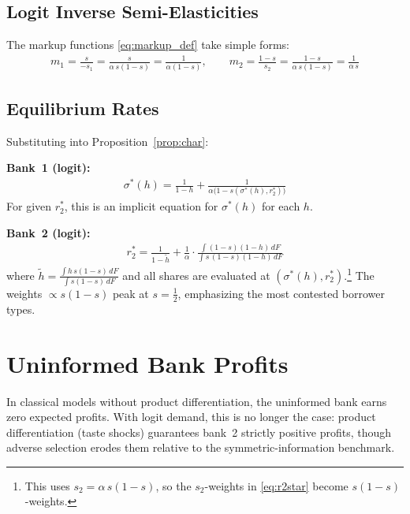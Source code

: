 \documentclass[12pt]{article}
\theoremstyle{plain}
\theoremstyle{plain}
\theoremstyle{definition}  %
\theoremstyle{remark}  %
\begin{document}
\subsection{Logit Inverse Semi-Elasticities}

The markup functions \eqref{eq:markup_def} take simple forms:
\begin{align}\label{eq:logit_m}
    m_1 = \frac{s}{-s_1} = \frac{s}{\alpha\, s(1-s)} = \frac{1}{\alpha(1-s)}, \qquad
    m_2 = \frac{1-s}{s_2} = \frac{1-s}{\alpha\, s(1-s)} = \frac{1}{\alpha\, s}
\end{align}

\subsection{Equilibrium Rates}

Substituting into Proposition~\ref{prop:char}:

\medskip\noindent
\textbf{Bank~1 (logit):}
\begin{align}\label{eq:sigma_logit}
    \sigma^*(h) = \frac{1}{1-h} + \frac{1}{\alpha\big(1 - s(\sigma^*(h), r_2^*)\big)}
\end{align}
For given $r_2^*$, this is an implicit equation for $\sigma^*(h)$ for each $h$.

\medskip\noindent
\textbf{Bank~2 (logit):}
\begin{align}\label{eq:r2_logit}
    r_2^* = \frac{1}{1 - \tilde{h}} + \frac{1}{\alpha}\cdot\frac{\displaystyle\int (1-s)(1-h)\, dF}{\displaystyle\int s\,(1-s)(1-h)\, dF}
\end{align}
where $\tilde{h} = \frac{\int h\, s(1-s)\, dF}{\int s(1-s)\, dF}$ and all shares are evaluated at $(\sigma^*(h), r_2^*)$.\footnote{This uses $s_2 = \alpha\,s(1-s)$, so the $s_2$-weights in \eqref{eq:r2star} become $s(1-s)$-weights.} The weights $\propto s(1-s)$ peak at $s = \frac{1}{2}$, emphasizing the most contested borrower types.



\section{Uninformed Bank Profits}\label{sec:bank2profits}

In classical models without product differentiation, the uninformed bank earns zero expected profits. With logit demand, this is no longer the case: product differentiation (taste shocks) guarantees bank~2 strictly positive profits, though adverse selection erodes them relative to the symmetric-information benchmark.
\end{document}
